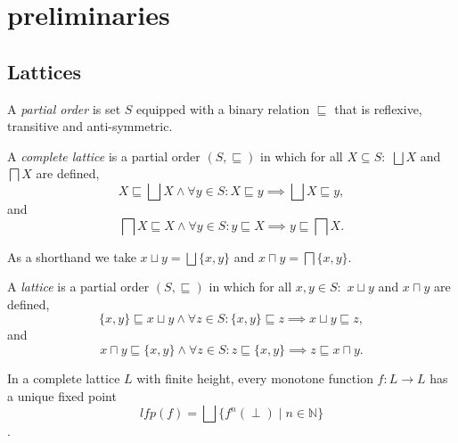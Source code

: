 
\section{preliminaries}\label{sec:preliminaries}

\subsection{Lattices}\label{sec:lattices}

\begin{definition}
    A \textit{partial order} is set $S$ equipped with a binary relation $\sqsubseteq$ that is reflexive, transitive and anti-symmetric.
\end{definition}

\begin{definition}
    A \textit{complete lattice} is a partial order $(S, \sqsubseteq)$ in which for all $X \subseteq S:$ $\bigsqcup X$ and $\bigsqcap X$ are defined,
        \begin{equation*}
            X \sqsubseteq \bigsqcup X \land \forall y \in S : X \sqsubseteq y \implies \bigsqcup X \sqsubseteq y,
        \end{equation*}
        and
        \begin{equation*}
            \bigsqcap X \sqsubseteq X \land \forall y \in S : y \sqsubseteq X \implies y \sqsubseteq \bigsqcap X.
        \end{equation*}
\end{definition}

As a shorthand we take $x \sqcup y = \bigsqcup \{x, y\}$ and $x \sqcap y = \bigsqcap \{x, y\}$.

\begin{definition}
    A \textit{lattice} is a partial order $(S, \sqsubseteq)$ in which for all $x,y \in S:$ $x \sqcup y$ and $x \sqcap y$ are defined,
        \begin{equation*}
            \{x, y\} \sqsubseteq x \sqcup y \land \forall z \in S : \{x, y\} \sqsubseteq z \implies x \sqcup y \sqsubseteq z,
        \end{equation*}
        and
        \begin{equation*}
            x \sqcap y \sqsubseteq \{x, y\} \land \forall z \in S : z \sqsubseteq \{x, y\} \implies z \sqsubseteq x \sqcap y.
        \end{equation*}
\end{definition}

\begin{theorem}
    In a complete lattice $L$ with finite height, every monotone function $f : L \rightarrow L$ has a unique fixed point
    \begin{equation*}
        lfp(f) = \bigsqcup\{f^n(\perp) \mid n \in \mathbb{N}\}
    \end{equation*}.
\end{theorem}

